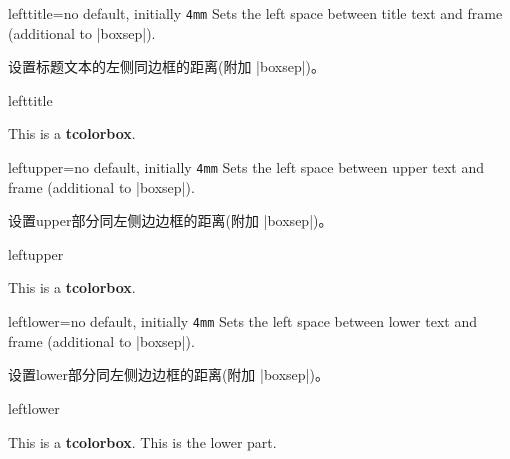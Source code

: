 \begin{docTcbKey}{lefttitle}{=}{no default, initially \texttt{4mm}}
  Sets the left space between title text and frame (additional to |boxsep|).

设置标题文本的左侧同边框的距离(附加 |boxsep|)。
\begin{exdispExample}{lefttitle}

\begin{tcolorbox}[lefttitle=3cm,title=My Title]
This is a \textbf{tcolorbox}.
\end{tcolorbox}
\end{exdispExample}
\end{docTcbKey}


\begin{docTcbKey}{leftupper}{=}{no default, initially \texttt{4mm}}
  Sets the left space between upper text and frame (additional to |boxsep|).

设置upper部分同左侧边边框的距离(附加 |boxsep|)。
\begin{exdispExample}{leftupper}

\begin{tcolorbox}[leftupper=3cm,title=My Title]
This is a \textbf{tcolorbox}.
\end{tcolorbox}
\end{exdispExample}
\end{docTcbKey}

\begin{docTcbKey}{leftlower}{=}{no default, initially \texttt{4mm}}
  Sets the left space between lower text and frame (additional to |boxsep|).

设置lower部分同左侧边边框的距离(附加 |boxsep|)。
\begin{exdispExample}{leftlower}

\begin{tcolorbox}[leftlower=3cm]
This is a \textbf{tcolorbox}.
\tcblower
This is the lower part.
\end{tcolorbox}
\end{exdispExample}
\end{docTcbKey}

\enlargethispage*{1cm}

